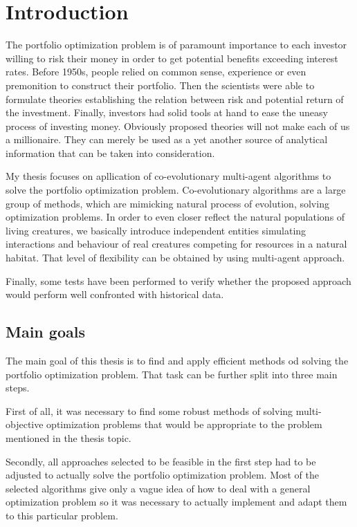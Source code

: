 \chapter{Introduction}
\label{cha:introduction}

The portfolio optimization problem is of paramount importance to each investor willing to risk their money in order to get potential benefits exceeding interest rates.
Before 1950s, people relied on common sense, experience or even premonition to construct their portfolio.
Then the scientists were able to formulate theories establishing the relation between risk and potential return of the investment.
Finally, investors had solid tools at hand to ease the uneasy process of investing money.
Obviously proposed theories will not make each of us a millionaire.
They can merely be used as a yet another source of analytical information that can be taken into consideration.

My thesis focuses on apllication of co-evolutionary multi-agent algorithms to solve the portfolio optimization problem.
Co-evolutionary algorithms are a large group of methods, which are mimicking natural process of evolution, solving optimization problems.
In order to even closer reflect the natural populations of living creatures, we basically introduce independent entities simulating interactions and behaviour of real creatures
competing for resources in a natural habitat.
That level of flexibility can be obtained by using multi-agent approach.

Finally, some tests have been performed to verify whether the proposed approach would perform well confronted with historical data. 
     



\section{Main goals}
\label{sec:mainGoals}

The main goal of this thesis is to find and apply efficient methods od solving the portfolio optimization problem. That task can be further split into three main steps.

First of all, it was necessary to find some robust methods of solving multi-objective optimization problems that would be appropriate to the problem mentioned in the thesis topic.

Secondly, all approaches selected to be feasible in the first step had to be adjusted to actually solve the portfolio optimization problem.
Most of the selected algorithms give only a vague idea of how to deal with a general optimization problem so it was necessary to actually implement and adapt them to this
 particular problem.

